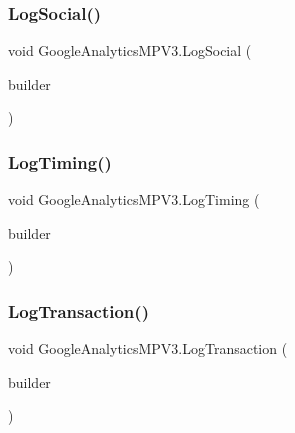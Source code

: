 \mbox{\label{class_google_analytics_m_p_v3_a7abb6d53c68e3cba6bbd5cf3423b10a6}} 
\subsubsection{\texorpdfstring{Log\+Social()}{LogSocial()}}
{\footnotesize\ttfamily void Google\+Analytics\+M\+P\+V3.\+Log\+Social (\begin{DoxyParamCaption}\item[{\hyperlink{class_social_hit_builder}{Social\+Hit\+Builder}}]{builder }\end{DoxyParamCaption})}

\mbox{\label{class_google_analytics_m_p_v3_a41d4eedd34170215310c7b628225a3e2}} 
\subsubsection{\texorpdfstring{Log\+Timing()}{LogTiming()}}
{\footnotesize\ttfamily void Google\+Analytics\+M\+P\+V3.\+Log\+Timing (\begin{DoxyParamCaption}\item[{\hyperlink{class_timing_hit_builder}{Timing\+Hit\+Builder}}]{builder }\end{DoxyParamCaption})}

\mbox{\label{class_google_analytics_m_p_v3_aa2594bd070308b7bdbafb23d0349d24d}} 
\subsubsection{\texorpdfstring{Log\+Transaction()}{LogTransaction()}}
{\footnotesize\ttfamily void Google\+Analytics\+M\+P\+V3.\+Log\+Transaction (\begin{DoxyParamCaption}\item[{\hyperlink{class_transaction_hit_builder}{Transaction\+Hit\+Builder}}]{builder }\end{DoxyParamCaption})}

